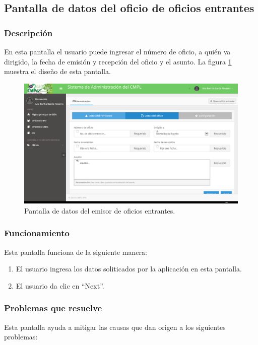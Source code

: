 \subsection{Pantalla de datos del oficio de oficios entrantes}
\subsubsection{Descripción}
	En esta pantalla el usuario puede ingresar el número de oficio, a quién va dirigido, la fecha de emisión y recepción del oficio y el asunto. La figura \ref{fig:Wizard2DatosDelOficio} muestra el diseño de esta pantalla.		
		
	\begin{figure}[htbp!]
		\centering
			\includegraphics[width=1\textwidth]{Pantallas/Wizard2DatosDelOficio.png}
		\caption{Pantalla de datos del emisor de oficios entrantes.}
		\label{fig:Wizard2DatosDelOficio}
	\end{figure}

\subsubsection{Funcionamiento}
	Esta pantalla funciona de la siguiente manera:
	
	\begin{enumerate}
		\item El usuario ingresa los datos soliticados por la aplicación en esta pantalla.
		\item El usuario da clic en ``Next''.
	\end{enumerate}

\subsubsection{Problemas que resuelve}
Esta pantalla ayuda a mitigar las causas que dan origen a los siguientes problemas:

